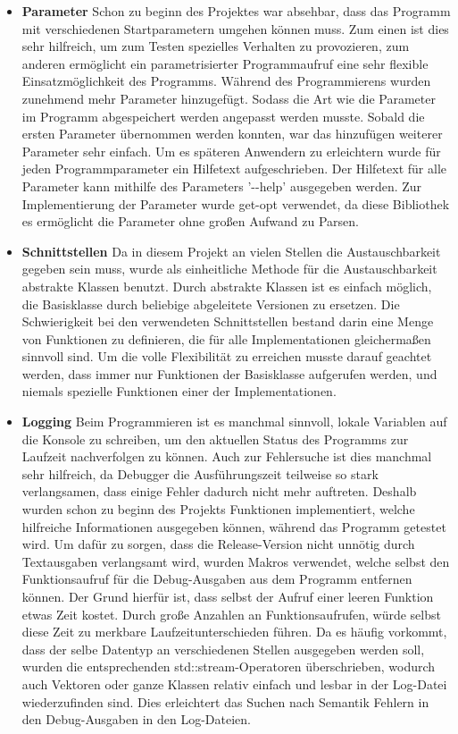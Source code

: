 \documentclass[
12pt,
a4paper,
BCOR10mm,
DIV14,
headsepline,
]{scrreprt}
\begin{document}
	\begin{itemize}
		\item \textbf{Parameter} Schon zu beginn des Projektes war absehbar, dass das Programm mit verschiedenen Startparametern umgehen können muss. Zum einen ist dies sehr hilfreich, um zum Testen spezielles Verhalten zu provozieren, zum anderen ermöglicht ein parametrisierter Programmaufruf eine sehr flexible Einsatzmöglichkeit des Programms. Während des Programmierens wurden zunehmend mehr Parameter hinzugefügt. Sodass die Art wie die Parameter im Programm abgespeichert werden angepasst werden musste. Sobald die ersten Parameter übernommen werden konnten, war das hinzufügen weiterer Parameter sehr einfach. Um es späteren Anwendern zu erleichtern wurde für jeden Programmparameter ein Hilfetext aufgeschrieben. Der Hilfetext für alle Parameter kann mithilfe des Parameters '-{}-help' ausgegeben werden. Zur Implementierung der Parameter wurde get-opt verwendet, da diese Bibliothek es ermöglicht die Parameter ohne großen Aufwand zu Parsen.
		\item \textbf{Schnittstellen} Da in diesem Projekt an vielen Stellen die Austauschbarkeit gegeben sein muss, wurde als einheitliche Methode für die Austauschbarkeit abstrakte Klassen benutzt. Durch abstrakte Klassen ist es einfach möglich, die Basisklasse durch beliebige abgeleitete Versionen zu ersetzen. Die Schwierigkeit bei den verwendeten Schnittstellen bestand darin eine Menge von Funktionen zu definieren, die für alle Implementationen gleichermaßen sinnvoll sind. Um die volle Flexibilität zu erreichen musste darauf geachtet werden, dass immer nur Funktionen der Basisklasse aufgerufen werden, und niemals spezielle Funktionen einer der Implementationen.
		\item \textbf{Logging} Beim Programmieren ist es manchmal sinnvoll, lokale Variablen auf die Konsole zu schreiben, um den aktuellen Status des Programms zur Laufzeit nachverfolgen zu können. Auch zur Fehlersuche ist dies manchmal sehr hilfreich, da Debugger die Ausführungszeit teilweise so stark verlangsamen, dass einige Fehler dadurch nicht mehr auftreten. Deshalb wurden schon zu beginn des Projekts Funktionen implementiert, welche hilfreiche Informationen ausgegeben können, während das Programm getestet wird. Um dafür zu sorgen, dass die Release-Version nicht unnötig durch Textausgaben verlangsamt wird, wurden Makros verwendet, welche selbst den Funktionsaufruf für die Debug-Ausgaben aus dem Programm entfernen können. Der Grund hierfür ist, dass selbst der Aufruf einer leeren Funktion etwas Zeit kostet. Durch große Anzahlen an Funktionsaufrufen, würde selbst diese Zeit zu merkbare Laufzeitunterschieden führen. Da es häufig vorkommt, dass der selbe Datentyp an verschiedenen Stellen ausgegeben werden soll, wurden die entsprechenden std::stream-Operatoren überschrieben, wodurch auch Vektoren oder ganze Klassen relativ einfach und lesbar in der Log-Datei wiederzufinden sind. Dies erleichtert das Suchen nach Semantik Fehlern in den Debug-Ausgaben in den Log-Dateien.

\end{itemize}
\end{document}
